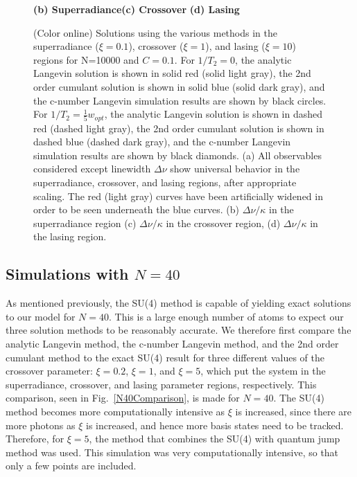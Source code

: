 \documentclass[aps,prl,twocolumn,
superscriptaddress,groupedaddress]{revtex4}
\begin{document}
\begin{figure}
\begin{center}
	\hspace{-10mm}\textbf{(b) Superradiance}\hspace{33mm}\textbf{(c) Crossover}
  \hspace{37mm}\textbf{(d) Lasing}
\end{center}
		\vspace{-5mm}
\caption{(Color online) Solutions using the various methods in the
superradiance ($\xi=0.1$), crossover ($\xi=1$), and lasing ($\xi=10$)
regions for N=10000 and $C=0.1$. For $1/T_2=0$, the analytic Langevin
solution is shown in solid red (solid light gray), the 2nd order
cumulant solution is shown in solid blue (solid dark gray), and the
c-number Langevin simulation results are shown by black circles. For
$1/T_2=\frac{1}{5} w_{opt}$, the analytic Langevin solution is shown in
dashed red (dashed light gray), the 2nd order cumulant solution is shown
in dashed blue (dashed dark gray), and the c-number Langevin simulation
results are shown by black diamonds. (a) All observables considered
except linewidth  $\Delta \nu$ show universal behavior in the
superradiance, crossover, and lasing regions, after appropriate scaling.
The red (light gray) curves have been artificially widened in order to
be seen underneath the blue curves. (b)  $\Delta \nu / \kappa$ in the
superradiance region (c) $\Delta \nu / \kappa$ in the crossover region,
(d) $\Delta \nu / \kappa$ in the lasing region.}
 \label{N10000Comparison}
\end{figure}


\subsection{Simulations with $N=40$}

As mentioned previously, the SU(4) method is capable of yielding exact
solutions to our model for $N=40$. This is a large enough number of
atoms to expect our three solution methods to be reasonably accurate. We
therefore first compare the analytic Langevin method, the c-number
Langevin method, and the 2nd order cumulant method to the exact SU(4)
result for three different values of the crossover parameter:
$\xi=0.2$, $\xi=1$, and $\xi=5$, which put the system in the
superradiance, crossover, and lasing parameter regions, respectively.
This comparison, seen in Fig.~\ref{N40Comparison}, is made for $N=40$.
The SU(4) method becomes more computationally intensive as $\xi$ is
increased, since there are more photons as $\xi$ is increased, and hence
more basis states need to be tracked. Therefore, for $\xi=5$, the method
that combines the SU(4) with quantum jump method was used. This
simulation was very computationally intensive, so that only a few points
are included.
\end{document}
